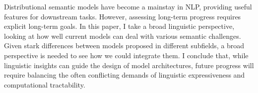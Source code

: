 Distributional semantic models have become a mainstay in NLP, providing useful features for downstream tasks.  However, assessing long-term progress requires explicit long-term goals.  In this paper, I take a broad linguistic perspective, looking at how well current models can deal with various semantic challenges.  Given stark differences between models proposed in different subfields, a broad perspective is needed to see how we could integrate them.  I conclude that, while linguistic insights can guide the design of model architectures, future progress will require balancing the often conflicting demands of linguistic expressiveness and computational tractability.
